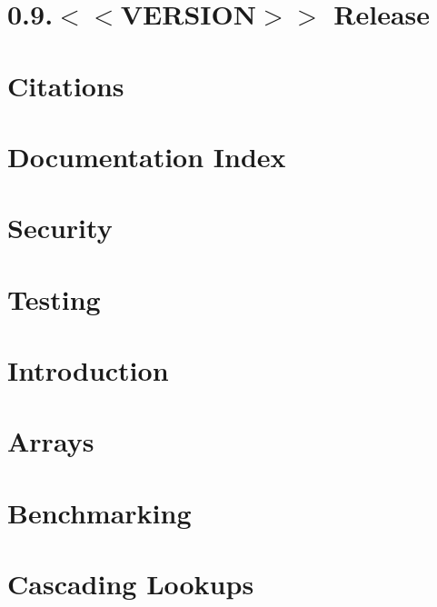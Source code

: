 \let\mypdfximage\pdfximage\def\pdfximage{\immediate\mypdfximage}\documentclass[twoside]{book}
\newcommand{\+}{\discretionary{\mbox{\scriptsize$\hookleftarrow$}}{}{}}
\begin{document}
\chapter{0.9.$<$$<$VERSION$>$$>$ Release}
\label{doc_news__preparation_next_release_md}

\chapter{Citations}
\label{doc_paper_README_md}

\chapter{Documentation Index}
\label{doc_README_md}

\chapter{Security}
\label{doc_SECURITY_md}

\chapter{Testing}
\label{doc_TESTING_md}

\chapter{Introduction}
\label{doc_tutorials_application-integration_md}

\chapter{Arrays}
\label{doc_tutorials_arrays_md}

\chapter{Benchmarking}
\label{doc_tutorials_benchmarking_md}

\chapter{Cascading Lookups}
\label{doc_tutorials_cascading_md}

\end{document}
